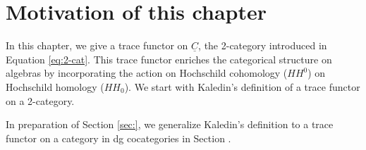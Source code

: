 \section{Motivation of this chapter}
In this chapter, we give a trace functor 
on $\underline{C}$, the 2-category 
introduced in Equation 
\ref{eq:2-cat}. This trace functor enriches 
the categorical structure on algebras by 
incorporating the action on Hochschild 
cohomology ($HH^0$) on Hochschild homology 
($HH_0$). We start with Kaledin's definition 
of a trace functor on a 2-category.

In preparation of Section \ref{sec:}, we 
generalize Kaledin's definition to a 
trace functor on a category in dg cocategories 
in Section \label{sec:redefine_trace}.